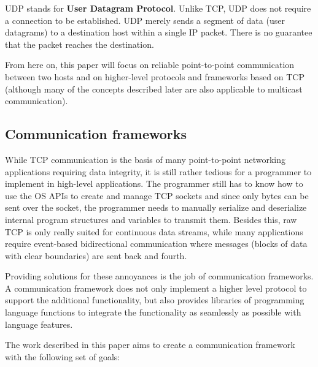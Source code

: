 \documentclass[conference]{IEEEtran}
\begin{document}
UDP stands for \textbf{User Datagram Protocol}. Unlike TCP, UDP does not require a connection to be established. UDP merely sends a segment of data (user datagrams) to a destination host within a single IP packet. There is no guarantee that the packet reaches the destination. 

From here on, this paper will focus on reliable point-to-point communication between two hosts and on higher-level protocols and frameworks based on TCP (although many of the concepts described later are also applicable to multicast communication).


\subsection{Communication frameworks}

While TCP communication is the basis of many point-to-point networking applications requiring data integrity, it is still rather tedious for a programmer to implement in high-level applications. The programmer still has to know how to use the OS APIs to create and manage TCP sockets and since only bytes can be sent over the socket, the programmer needs to manually serialize and deserialize internal program structures and variables to transmit them. Besides this, raw TCP is only really suited for continuous data streams, while many applications require event-based bidirectional communication where messages (blocks of data with clear boundaries) are sent back and fourth.

Providing solutions for these annoyances is the job of communication frameworks. A communication framework does not only implement a higher level protocol to support the additional functionality, but also provides libraries of programming language functions to integrate the functionality as seamlessly as possible with language features.

The work described in this paper aims to create a communication framework with the following set of goals:
\end{document}
